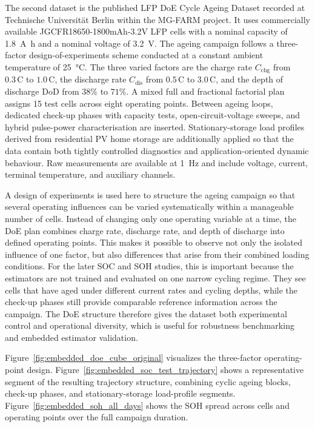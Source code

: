 \documentclass[
    a4paper,
    12pt,
    titlepage,
    bibliography=totoc,
    twoside=on,
    parskip=false,
    numbers=noenddot,
    cleardoublepage=empty,
    DIV=12,
    BCOR=12.0mm,
    headheight=36pt,
    headings=openright
]{scrreprt}
\begin{document}
The second dataset is the published LFP DoE Cycle Ageing Dataset recorded at Technische Universit\"at Berlin within the MG-FARM project.\autocite{lfpDoeCycleAgingDataset2025} It uses commercially available JGCFR18650-1800mAh-3.2V LFP cells with a nominal capacity of \SI{1.8}{\ampere\hour} and a nominal voltage of \SI{3.2}{\volt}. The ageing campaign follows a three-factor design-of-experiments scheme conducted at a constant ambient temperature of \SI{25}{\celsius}. The three varied factors are the charge rate $C_\mathrm{chg}$ from $0.3\,\mathrm{C}$ to $1.0\,\mathrm{C}$, the discharge rate $C_\mathrm{dis}$ from $0.5\,\mathrm{C}$ to $3.0\,\mathrm{C}$, and the depth of discharge $\mathrm{DoD}$ from $38\%$ to $71\%$. A mixed full and fractional factorial plan assigns 15 test cells across eight operating points. Between ageing loops, dedicated check-up phases with capacity tests, open-circuit-voltage sweeps, and hybrid pulse-power characterisation are inserted. Stationary-storage load profiles derived from residential PV home storage are additionally applied so that the data contain both tightly controlled diagnostics and application-oriented dynamic behaviour. Raw measurements are available at \SI{1}{\hertz} and include voltage, current, terminal temperature, and auxiliary channels.

A design of experiments is used here to structure the ageing campaign so that several operating influences can be varied systematically within a manageable number of cells.\autocite{siebertzStatistischeVersuchsplanung2017} Instead of changing only one operating variable at a time, the DoE plan combines charge rate, discharge rate, and depth of discharge into defined operating points. This makes it possible to observe not only the isolated influence of one factor, but also differences that arise from their combined loading conditions. For the later SOC and SOH studies, this is important because the estimators are not trained and evaluated on one narrow cycling regime. They see cells that have aged under different current rates and cycling depths, while the check-up phases still provide comparable reference information across the campaign. The DoE structure therefore gives the dataset both experimental control and operational diversity, which is useful for robustness benchmarking and embedded estimator validation.

Figure~\ref{fig:embedded_doe_cube_original} visualizes the three-factor operating-point design. Figure~\ref{fig:embedded_soc_test_trajectory} shows a representative segment of the resulting trajectory structure, combining cyclic ageing blocks, check-up phases, and stationary-storage load-profile segments. Figure~\ref{fig:embedded_soh_all_days} shows the SOH spread across cells and operating points over the full campaign duration.
\end{document}

